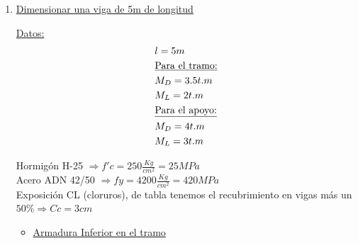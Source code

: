 \begin{enumerate}
\item \underline{Dimensionar una viga de 5m de longitud}

\underline{Datos:}\\
\begin{align*}
& l=5m\\
& \text{\underline{Para el tramo:}}\\
& M_D=3.5 t.m\\
& M_L=2 t.m\\
& \text{\underline{Para el apoyo:}}\\
& M_D=4 t.m\\
& M_L=3 t.m
\end{align*}

Hormigón H-25 $\Rightarrow f'c = 250 \frac{Kg}{cm^2} = 25 MPa$\\
Acero ADN 42/50 $\Rightarrow fy = 4200 \frac{Kg}{cm^2} = 420 MPa$\\
Exposición CL (cloruros), de tabla tenemos el recubrimiento en vigas más un $50\% \Rightarrow Cc=3cm$\\

\newpage
\begin{itemize}
\item \underline{Armadura Inferior en el tramo}


\end{itemize}
\end{enumerate}
